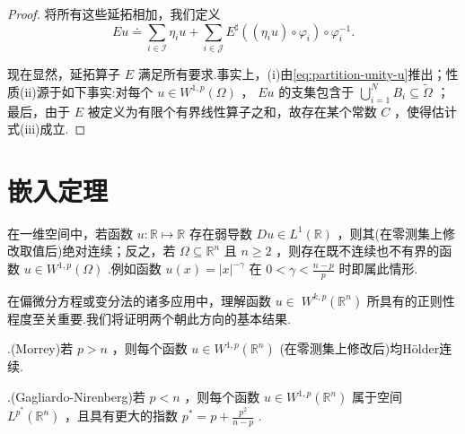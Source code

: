 \begin{proof}
将所有这些延拓相加，我们定义
\[
{Eu} \doteq  \sum_{{i \in  \mathcal{I}}}{\eta }_{i}u + \sum_{{i \in  \mathcal{J}}}{E}^{\sharp }\left( {\left( {{\eta }_{i}u}\right)  \circ  {\varphi }_{i}}\right)  \circ  {\varphi }_{i}^{-1}.
\]

现在显然，延拓算子 $E$ 满足所有要求.事实上，(i)由\eqref{eq:partition-unity-u}推出；性质(ii)源于如下事实:对每个 $u \in  {W}^{1,p}\left( \Omega \right)$ ， ${Eu}$ 的支集包含于 $\mathop{\bigcup }\limits_{{i = 1}}^{N}{B}_{i} \subseteq  \widetilde{\Omega }$ ；最后，由于 $E$ 被定义为有限个有界线性算子之和，故存在某个常数 $C$ ，使得估计式(iii)成立.

\end{proof}

\section{嵌入定理}

在一维空间中，若函数 $u : \mathbb{R} \mapsto  \mathbb{R}$ 存在弱导数 ${Du} \in  {L}^{1}\left( \mathbb{R}\right)$ ，则其(在零测集上修改取值后)绝对连续；反之，若 $\Omega  \subseteq  {\mathbb{R}}^{n}$ 且 $n \geq  2$ ，则存在既不连续也不有界的函数 $u \in  {W}^{1,p}\left( \Omega \right)$ .例如函数 $u\left( x\right)  = {\left| x\right| }^{-\gamma }$ 在 $0 < \gamma  < \frac{n - p}{p}$ 时即属此情形.

在偏微分方程或变分法的诸多应用中，理解函数 $u \in \; {W}^{k,p}\left( {\mathbb{R}}^{n}\right)$ 所具有的正则性程度至关重要.我们将证明两个朝此方向的基本结果.

.(Morrey)若 $p > n$ ，则每个函数 $u \in  {W}^{1,p}\left( {\mathbb{R}}^{n}\right)$ (在零测集上修改后)均Hölder连续.

.(Gagliardo-Nirenberg)若 $p < n$ ，则每个函数 $u \in  {W}^{1,p}\left( {\mathbb{R}}^{n}\right)$ 属于空间 ${L}^{{p}^{ * }}\left( {\mathbb{R}}^{n}\right)$ ，且具有更大的指数 ${p}^{ * } = p + \frac{{p}^{2}}{n - p}$ .

